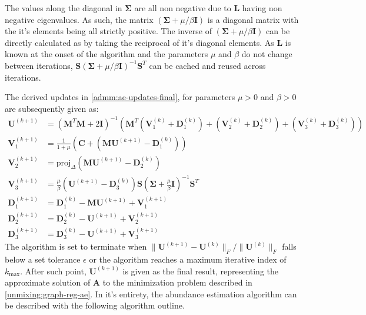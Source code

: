 The values along the diagonal in $\mathbf{\Sigma}$ are all non negative due to $\mathbf{L}$ having non negative eigenvalues. As such, the matrix $(\mathbf{\Sigma} + \mu / \beta \mathbf{I})$ is a diagonal matrix with the it's elements being all strictly positive. The inverse of $\left(\mathbf{\Sigma} + \mu / \beta \mathbf{I}\right)$ can be directly calculated as by taking the reciprocal of it's diagonal elements. As $\mathbf{L}$ is known at the onset of the algorithm and the parameters $\mu$ and $\beta$ do not change between iterations, $\mathbf{S} (\mathbf{\Sigma} + \mu / \beta \mathbf{I})^{-1} \mathbf{S}^T$ can be cached and reused across iterations.

The derived updates in \eqref{admm:ae-updates-final}, for parameters $\mu > 0$ and $\beta > 0$ are subsequently given as:
\begin{subequations}
  \begin{align}
    \mathbf{U}^{(k+1)} & = (\mathbf{M}^T \mathbf{M} + 2\mathbf{I})^{-1}\left(\mathbf{M}^T\left(\mathbf{V}_1^{(k)}+\mathbf{D}_1^{(k)}\right) + \left(\mathbf{V}_2^{(k)}+\mathbf{D}_2^{(k)}\right) + \left(\mathbf{V}_3^{(k)}+\mathbf{D}_3^{(k)}\right)\right) \label{unmixing:u} 
    \\
    \mathbf{V}_1^{(k+1)} &= \frac{1}{1+\mu} \left(\mathbf{C} + \left(\mathbf{MU}^{(k+1)} - \mathbf{D}_1^{(k)}\right)\right) \label{unmixing:v1} 
    \\
    \mathbf{V}_2^{(k+1)} &= \text{proj}_\Delta\left(\mathbf{MU}^{(k+1)} - \mathbf{D}_2^{(k)}\right) \label{unmixing:v2} 
    \\
    \mathbf{V}_3^{(k+1)} &= \frac{\mu}{\beta}\left(\mathbf{U}^{(k+1)} - \mathbf{D}_3^{(k)}\right) \mathbf{S} \left(\mathbf{\Sigma} + \frac{\mu}{\beta} \mathbf{I}\right)^{-1} \mathbf{S}^T \label{unmixing:v3} 
    \\
    \mathbf{D}_1^{(k+1)} &= \mathbf{D}_1^{(k)} - \mathbf{MU}^{(k+1)} + \mathbf{V}_1^{(k+1)} \label{unmixing:d1}  \\
    \mathbf{D}_2^{(k+1)} &= \mathbf{D}_2^{(k)} - \mathbf{U}^{(k+1)} + \mathbf{V}_2^{(k+1)} \label{unmixing:d2}  \\
    \mathbf{D}_3^{(k+1)} &= \mathbf{D}_3^{(k)} - \mathbf{U}^{(k+1)} + \mathbf{V}_3^{(k+1)} \label{unmixing:d3} 
  \end{align}
\end{subequations}
The algorithm is set to terminate when $ \|\mathbf{U}^{(k+1)} - \mathbf{U}^{(k)}\|_F/\|\mathbf{U}^{(k)}\|_F $ falls below a set tolerance $\epsilon$ or the algorithm reaches a maximum iterative index of $k_{\text{max}}$. After such point, $\mathbf{U}^{(k+1)}$ is given as the final result, representing the approximate solution of $\mathbf{A}$ to the minimization problem described in \eqref{unmixing:graph-reg-ae}. In it's entirety, the abundance estimation algorithm can be described with the following algorithm outline.

